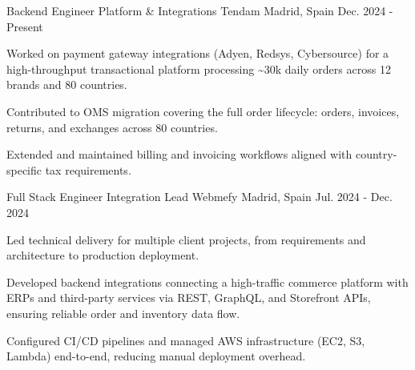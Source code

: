 

\begin{cventries}

\cventry
    {Backend Engineer \textbar{} Platform \& Integrations} %
    {Tendam} %
    {Madrid, Spain} %
    {Dec. 2024 - Present} %
    {
      \begin{cvitems}
        \item {Worked on payment gateway integrations (Adyen, Redsys, Cybersource) for a high-throughput transactional platform processing \textasciitilde{}30k daily orders across 12 brands and 80 countries.}
        \item {Contributed to OMS migration covering the full order lifecycle: orders, invoices, returns, and exchanges across 80 countries.}
        \item {Extended and maintained billing and invoicing workflows aligned with country-specific tax requirements.}
      \end{cvitems}
    }
  \vspace{9mm}
\cventry
    {Full Stack Engineer \textbar{} Integration Lead} %
    {Webmefy} %
    {Madrid, Spain} %
    {Jul. 2024 - Dec. 2024} %
    {
      \begin{cvitems}
        \item {Led technical delivery for multiple client projects, from requirements and architecture to production deployment.}
        \item {Developed backend integrations connecting a high-traffic commerce platform with ERPs and third-party services via REST, GraphQL, and Storefront APIs, ensuring reliable order and inventory data flow.}
        \item {Configured CI/CD pipelines and managed AWS infrastructure (EC2, S3, Lambda) end-to-end, reducing manual deployment overhead.}
      \end{cvitems}
    }
  \vspace{9mm}

\end{cventries}

